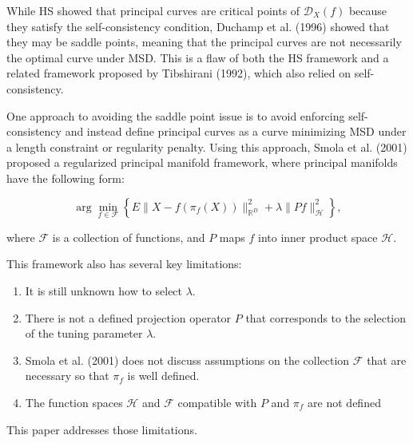While HS showed that principal curves are critical points of $\mathcal{D}_X(f)$ because they satisfy the self-consistency condition, Duchamp et al. (1996) showed that they may be saddle points, meaning that the principal curves are not necessarily the optimal curve under MSD. This is a flaw of both the HS framework and a related framework proposed by Tibshirani (1992), which also relied on self-consistency.

One approach to avoiding the saddle point issue is to avoid enforcing self-consistency and instead define principal curves as a curve minimizing MSD under a length constraint or regularity penalty. Using this approach, Smola et al. (2001) proposed a regularized principal manifold framework, where principal manifolds have the following form:

\[%
  \arg \min_{f \in \mathcal{F}}\left\{E\|X - f(\pi_f(X))\|_{\mathbb{R}^{D}}^2 + \lambda\|Pf\|_{\mathcal{H}}^2\right\}
,\]%

where $\mathcal{F}$ is a collection of functions, and $P$ maps $f$ into inner product space $\mathcal{H}$.

This framework also has several key limitations:
\begin{enumerate}
  \label{enum:smola_limitations}

  \item It is still unknown how to select $\lambda$.
  \item There is not a defined projection operator $P$ that corresponds to the selection of the tuning parameter $\lambda$.
  \item Smola et al. (2001) does not discuss assumptions on the collection $\mathcal{F}$ that are necessary so that $\pi_f$ is well defined.
  \item The function spaces $\mathcal{H}$ and $\mathcal{F}$ compatible with $P$ and $\pi_f$ are not defined
\end{enumerate}

This paper addresses those limitations.

